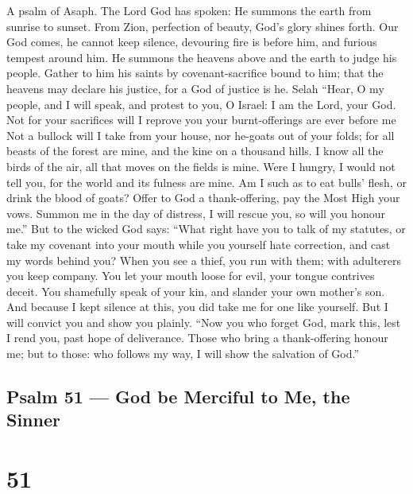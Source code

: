 A psalm of Asaph.  The Lord God has spoken: He summons the
earth from sunrise to sunset.  From Zion, perfection of
beauty, God's glory shines forth.  Our God comes, he cannot
keep silence, devouring fire is before him, and furious tempest around
him.  He summons the heavens above and the earth to judge
his people.  Gather to him his saints by covenant-sacrifice
bound to him;  that the heavens may declare his justice, for
a God of justice is he. Selah  ``Hear, O my people, and I
will speak, and protest to you, O Israel: I am the Lord, your God.
 Not for your sacrifices will I reprove you your
burnt-offerings are ever before me  Not a bullock will I
take from your house, nor he-goats out of your folds;  for
all beasts of the forest are mine, and the kine on a thousand hills.
 I know all the birds of the air, all that moves on the
fields is mine.  Were I hungry, I would not tell you, for
the world and its fulness are mine.  Am I such as to eat
bulls' flesh, or drink the blood of goats?  Offer to God a
thank-offering, pay the Most High your vows.  Summon me in
the day of distress, I will rescue you, so will you honour me.''
 But to the wicked God says: ``What right have you to talk
of my statutes, or take my covenant into your mouth  while
you yourself hate correction, and cast my words behind you?
 When you see a thief, you run with them; with adulterers
you keep company.  You let your mouth loose for evil, your
tongue contrives deceit.  You shamefully speak of your kin,
and slander your own mother's son.  And because I kept
silence at this, you did take me for one like yourself. But I will
convict you and show you plainly.  ``Now you who forget
God, mark this, lest I rend you, past hope of deliverance. 
Those who bring a thank-offering honour me; but to those: who follows my
way, I will show the salvation of God.''

\hypertarget{psalm-51-god-be-merciful-to-me-the-sinner}{%
\subsection{Psalm 51 --- God be Merciful to Me, the
Sinner}\label{psalm-51-god-be-merciful-to-me-the-sinner}}

\hypertarget{section-50}{%
\section{51}\label{section-50}}

